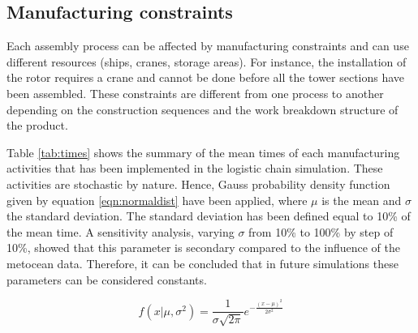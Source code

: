 \subsection{Manufacturing constraints}
Each assembly process can be affected by manufacturing constraints and can use different resources (ships, cranes, storage areas). For instance, the installation of the rotor requires a crane and cannot be done before all the tower sections have been assembled. These constraints are different from one process to another depending on the construction sequences and the work breakdown structure of the product.

Table \ref{tab:times} shows the summary of the mean times of each manufacturing activities that has been implemented in the logistic chain simulation. These activities are stochastic by nature. Hence, Gauss probability density function given by equation \ref{eqn:normaldist} have been applied, where $\mu$ is the mean and $\sigma$ the standard deviation. The standard deviation has been defined equal to 10\% of the mean time. A sensitivity analysis, varying $\sigma$ from 10\% to 100\% by step of 10\%, showed that this parameter is secondary compared to the influence of the metocean data. Therefore, it can be concluded that in future simulations these parameters can be considered constants.

\begin{equation}
\label{eqn:normaldist}
f\left( x \vert \mu, \sigma^{2} \right) = \frac{1}{\sigma \sqrt{2 \pi} } e^{- \frac{ \left( x - \mu \right)^{2}} {2 \sigma^{2}} }
\end{equation}
